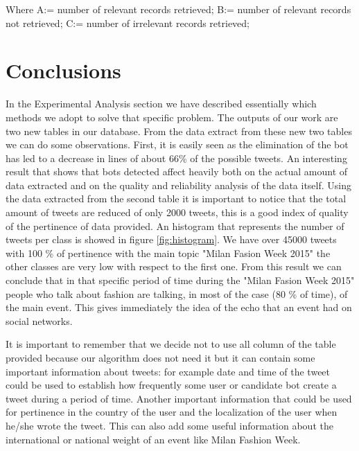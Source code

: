 \documentclass[conference, onecolumn]{IEEEtran}
\begin{document}
Where A:= number of relevant records retrieved; B:= number of relevant records not retrieved; C:= number of irrelevant records retrieved;

\section{Conclusions}\label{sec:conclusions}
In the Experimental Analysis section we have described essentially which methods we adopt to solve that specific problem. The outputs of our work are two new tables in our database. From the data extract from these new two tables we can do some observations. First, it is easily seen as the elimination of the bot has led to a decrease in lines of about 66\% of the possible tweets. An interesting result that shows that bots detected affect heavily both on the actual amount of data extracted and on the quality and reliability analysis of the data itself. Using the data extracted from the second table it is important to notice that the total amount of tweets are reduced of only 2000 tweets, this is a good index of quality of the pertinence of data provided. An histogram that represents the number of tweets per class is showed in figure \ref{fig:histogram}. We have over 45000 tweets with 100 \% of pertinence with the main topic "Milan Fasion Week 2015" the other classes are very low with respect to the first one. From this result we can conclude that in that specific period of time during the "Milan Fasion Week 2015" people who talk about fashion are talking, in most of the case (80 \% of time), of the main event. This gives immediately the idea of the echo that an event had on social networks.
\medskip

It is important to remember that we decide not to use all column of the table provided because our algorithm does not need it but it can contain some important information about tweets: for example date and time of the tweet could be used to establish how frequently some user or candidate bot create a tweet during a period of time. Another important information that could be used for pertinence in the country of the user and the localization of the user when he/she wrote the tweet. This can also add some useful information about the international or national weight of an event like Milan Fashion Week.
\medskip
\end{document}
